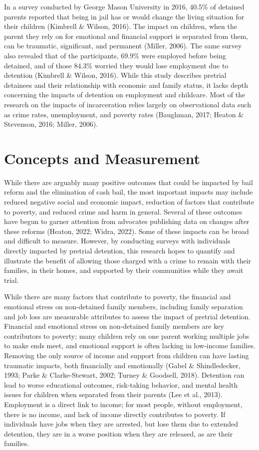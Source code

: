 \documentclass[
  letterpaper,
  DIV=11,
  numbers=noendperiod]{scrartcl}
\begin{document}
In a survey conducted by George Mason University in 2016, 40.5\% of
detained parents reported that being in jail has or would change the
living situation for their children (Kimbrell \& Wilson, 2016). The
impact on children, when the parent they rely on for emotional and
financial support is separated from them, can be traumatic, significant,
and permanent (Miller, 2006). The same survey also revealed that of the
participants, 69.9\% were employed before being detained, and of those
84.3\% worried they would lose employment due to detention (Kimbrell \&
Wilson, 2016). While this study describes pretrial detainees and their
relationship with economic and family status, it lacks depth concerning
the impacts of detention on employment and childcare. Most of the
research on the impacts of incarceration relies largely on observational
data such as crime rates, unemployment, and poverty rates (Baughman,
2017; Heaton \& Stevenson, 2016; Miller, 2006).

\hypertarget{concepts-and-measurement}{%
\section{Concepts and Measurement}\label{concepts-and-measurement}}

While there are arguably many positive outcomes that could be impacted
by bail reform and the elimination of cash bail, the most important
impacts may include reduced negative social and economic impact,
reduction of factors that contribute to poverty, and reduced crime and
harm in general. Several of these outcomes have begun to garner
attention from advocates publishing data on changes after these reforms
(Heaton, 2022; Widra, 2022). Some of these impacts can be broad and
difficult to measure. However, by conducting surveys with individuals
directly impacted by pretrial detention, this research hopes to quantify
and illustrate the benefit of allowing those charged with a crime to
remain with their families, in their homes, and supported by their
communities while they await trial.

While there are many factors that contribute to poverty, the financial
and emotional stress on non-detained family members, including family
separation and job loss are measurable attributes to assess the impact
of pretrial detention. Financial and emotional stress on non-detained
family members are key contributors to poverty; many children rely on
one parent working multiple jobs to make ends meet, and emotional
support is often lacking in low-income families. Removing the only
source of income and support from children can have lasting traumatic
impacts, both financially and emotionally (Gabel \& Shindledecker, 1993;
Parke \& Clarke-Stewart, 2002; Turney \& Goodsell, 2018). Detention can
lead to worse educational outcomes, risk-taking behavior, and mental
health issues for children when separated from their parents (Lee et
al., 2013). Employment is a direct link to income; for most people,
without employment, there is no income, and lack of income directly
contributes to poverty. If individuals have jobs when they are arrested,
but lose them due to extended detention, they are in a worse position
when they are released, as are their families.
\end{document}

